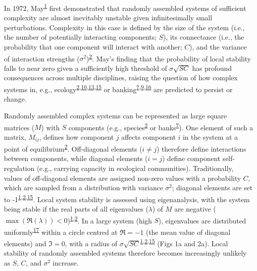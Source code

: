 \documentclass[]{article}
\begin{document}
In 1972, May\textsuperscript{\protect\hyperlink{ref-May1972}{1}} first
demonstrated that randomly assembled systems of sufficient complexity
are almost inevitably unstable given infinitesimally small
perturbations. Complexity in this case is defined by the size of the
system (i.e., the number of potentially interacting components; \(S\)), its 
connectance (i.e., the probability that one component will interact with 
another; \(C\)), and the variance of interaction strengths
(\(\sigma^{2}\))\textsuperscript{\protect\hyperlink{ref-Allesina2012}{2}}.
May's finding that the probability of local stability falls to near zero
given a sufficiently high threshold of \(\sigma\sqrt{SC}\) has profound
consequences across multiple disciplines, raising the question of how
complex systems in, e.g.,
ecology\textsuperscript{\protect\hyperlink{ref-Allesina2012}{2},\protect\hyperlink{ref-Mougi2012}{10},\protect\hyperlink{ref-Grilli2017}{13},\protect\hyperlink{ref-Allesina2015}{15}}
or
banking\textsuperscript{\protect\hyperlink{ref-Haldane2011}{7},\protect\hyperlink{ref-Bardoscia2017}{9},\protect\hyperlink{ref-May2008}{16}}
are predicted to persist or change.

Randomly assembled complex systems can be represented as large square
matrices (\(M\)) with \(S\) components (e.g.,
species\textsuperscript{\protect\hyperlink{ref-Allesina2012}{2}} or
banks\textsuperscript{\protect\hyperlink{ref-Haldane2011}{7}}). One
element of such a matrix, \(M_{ij}\), defines how component \(j\) affects
component \(i\) in the system at a point of
equilibrium\textsuperscript{\protect\hyperlink{ref-Allesina2012}{2}}.
Off-diagonal elements (\(i \neq j\)) therefore define interactions
between components, while diagonal elements (\(i = j\)) define component
self-regulation (e.g., carrying capacity in ecological communities).
Traditionally, values of off-diagonal elements are assigned non-zero
values with a probability \(C\), which are sampled from a distribution
with variance \(\sigma^{2}\); diagonal elements are set to
-1\textsuperscript{\protect\hyperlink{ref-May1972}{1},\protect\hyperlink{ref-Allesina2012}{2},\protect\hyperlink{ref-Allesina2015}{15}}.
Local system stability is assessed using eigenanalysis, with the system
being stable if the real parts of all eigenvalues (\(\lambda\)) of \(M\)
are negative
(\(\max\left(\Re(\lambda)\right) < 0\))\textsuperscript{\protect\hyperlink{ref-May1972}{1},\protect\hyperlink{ref-Allesina2012}{2}}.
In a large system (high \(S\)), eigenvalues are distributed
uniformly\textsuperscript{\protect\hyperlink{ref-Tao2010}{17}} within a
circle centred at \(\Re = -1\) (the mean value of diagonal elements) and
\(\Im = 0\), with a radius of
\(\sigma\sqrt{SC}\)\textsuperscript{\protect\hyperlink{ref-May1972}{1},\protect\hyperlink{ref-Allesina2012}{2},\protect\hyperlink{ref-Allesina2015}{15}}
(Figs 1a and 2a). Local stability of randomly assembled systems
therefore becomes increasingly unlikely as \(S\), \(C\), and
\(\sigma^{2}\) increase.
\end{document}
